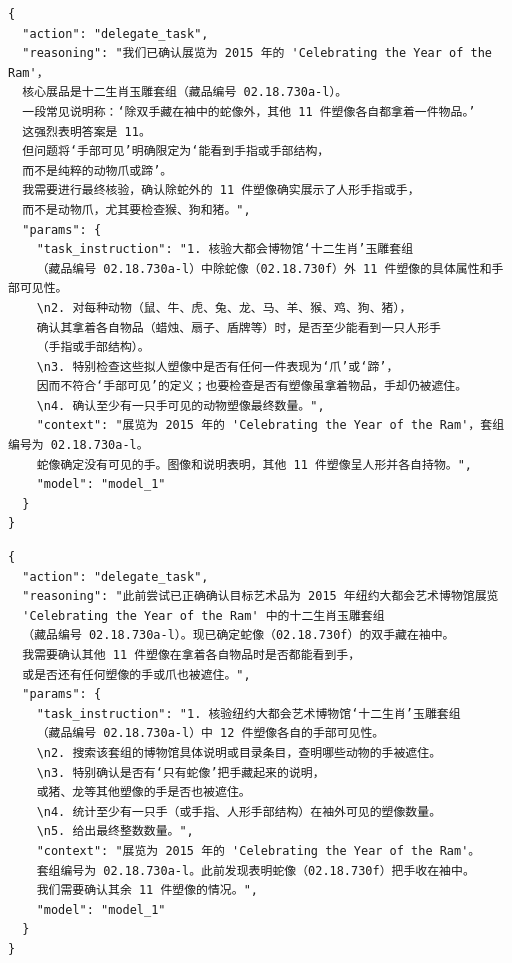 \begin{tcolorbox}[
  title={\textbf{\small 尝试 7 - 主智能体决策}},
  boxrule=1pt,
  arc=0mm,
  colback=gray!5,
  colframe=gray!70,
  breakable,
  before skip=10pt,
  after skip=10pt,
  pad at break=2mm,
  parbox=false
]
\begin{verbatim}
{
  "action": "delegate_task",
  "reasoning": "我们已确认展览为 2015 年的 'Celebrating the Year of the Ram'，
  核心展品是十二生肖玉雕套组（藏品编号 02.18.730a-l）。
  一段常见说明称：‘除双手藏在袖中的蛇像外，其他 11 件塑像各自都拿着一件物品。’
  这强烈表明答案是 11。
  但问题将‘手部可见’明确限定为‘能看到手指或手部结构，
  而不是纯粹的动物爪或蹄’。
  我需要进行最终核验，确认除蛇外的 11 件塑像确实展示了人形手指或手，
  而不是动物爪，尤其要检查猴、狗和猪。",
  "params": {
    "task_instruction": "1. 核验大都会博物馆‘十二生肖’玉雕套组
    （藏品编号 02.18.730a-l）中除蛇像（02.18.730f）外 11 件塑像的具体属性和手部可见性。
    \n2. 对每种动物（鼠、牛、虎、兔、龙、马、羊、猴、鸡、狗、猪），
    确认其拿着各自物品（蜡烛、扇子、盾牌等）时，是否至少能看到一只人形手
    （手指或手部结构）。
    \n3. 特别检查这些拟人塑像中是否有任何一件表现为‘爪’或‘蹄’，
    因而不符合‘手部可见’的定义；也要检查是否有塑像虽拿着物品，手却仍被遮住。
    \n4. 确认至少有一只手可见的动物塑像最终数量。",
    "context": "展览为 2015 年的 'Celebrating the Year of the Ram'，套组编号为 02.18.730a-l。
    蛇像确定没有可见的手。图像和说明表明，其他 11 件塑像呈人形并各自持物。",
    "model": "model_1"
  }
}
\end{verbatim}
\end{tcolorbox}

\begin{tcolorbox}[
  title={\textbf{\small 尝试 8 - 主智能体决策}},
  boxrule=1pt,
  arc=0mm,
  colback=gray!5,
  colframe=gray!70,
  breakable,
  before skip=10pt,
  after skip=10pt,
  pad at break=2mm,
  parbox=false
]
\begin{verbatim}
{
  "action": "delegate_task",
  "reasoning": "此前尝试已正确确认目标艺术品为 2015 年纽约大都会艺术博物馆展览
  'Celebrating the Year of the Ram' 中的十二生肖玉雕套组
  （藏品编号 02.18.730a-l）。现已确定蛇像（02.18.730f）的双手藏在袖中。
  我需要确认其他 11 件塑像在拿着各自物品时是否都能看到手，
  或是否还有任何塑像的手或爪也被遮住。",
  "params": {
    "task_instruction": "1. 核验纽约大都会艺术博物馆‘十二生肖’玉雕套组
    （藏品编号 02.18.730a-l）中 12 件塑像各自的手部可见性。
    \n2. 搜索该套组的博物馆具体说明或目录条目，查明哪些动物的手被遮住。
    \n3. 特别确认是否有‘只有蛇像’把手藏起来的说明，
    或猪、龙等其他塑像的手是否也被遮住。
    \n4. 统计至少有一只手（或手指、人形手部结构）在袖外可见的塑像数量。
    \n5. 给出最终整数数量。",
    "context": "展览为 2015 年的 'Celebrating the Year of the Ram'。
    套组编号为 02.18.730a-l。此前发现表明蛇像（02.18.730f）把手收在袖中。
    我们需要确认其余 11 件塑像的情况。",
    "model": "model_1"
  }
}
\end{verbatim}
\end{tcolorbox}

